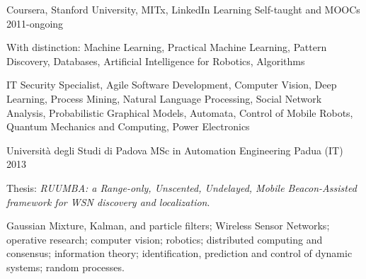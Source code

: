 
\begin{cventries}

	\cventry%
		{Coursera, Stanford University, MITx, LinkedIn Learning}
		{Self-taught and MOOCs}
		{}
		{2011-ongoing}
		{\begin{cvitems}
			\item {With distinction:
				Machine Learning,
				Practical Machine Learning,
				Pattern Discovery,
				Databases,
				Artificial Intelligence for Robotics,
				Algorithms
				}
			\item {%
				IT Security Specialist,
				Agile Software Development,
				Computer Vision,
				Deep Learning,
				Process Mining,
				Natural Language Processing,
				Social Network Analysis,
				Probabilistic Graphical Models,
				Automata,
				Control of Mobile Robots,
				Quantum Mechanics and Computing,
				Power Electronics
				}
		\end{cvitems}}

	\cventry%
		{Università degli Studi di Padova}
		{MSc in Automation Engineering}
		{Padua (IT)}
		{2013}
		{\begin{cvitems}
			\item {Thesis: \emph{RUUMBA: a Range-only, Unscented, Undelayed, Mobile Beacon-Assisted framework for WSN discovery and localization}.}
			\item {%
				Gaussian Mixture, Kalman, and particle filters;
				Wireless Sensor Networks;
				operative research;
				computer vision;
				robotics;
				distributed computing and consensus;
				information theory;
				identification, prediction and control of dynamic systems;
				random processes.
				}
		\end{cvitems}}


\end{cventries}

